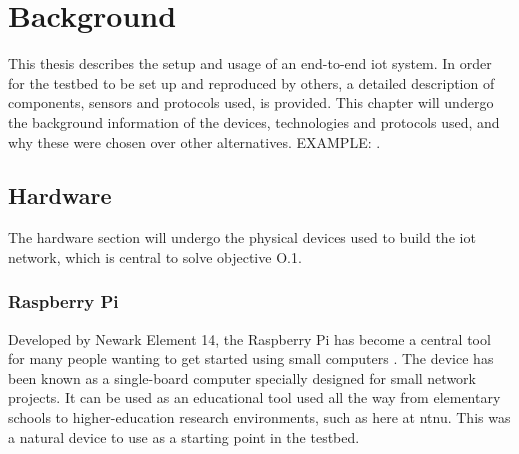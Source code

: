\chapter{Background}
\label{chp:background} 

\noindent This thesis describes the setup and usage of an end-to-end \gls{iot} system. In order for the testbed to be set up and reproduced by others, a detailed description of components, sensors and protocols used, is provided. This chapter will undergo the background information of the devices, technologies and protocols used, and why these were chosen over other alternatives. EXAMPLE: \cite{nord}. 






\section{Hardware}

\noindent The hardware section will undergo the physical devices used to build the \gls{iot} network, which is central to solve objective O.1. 

\subsection{Raspberry Pi}

\noindent Developed by Newark Element 14, the Raspberry Pi has become a central tool for many people wanting to get started using small computers \cite{newark}. The device has been known as a single-board computer specially designed for small network projects. It can be used as an educational tool used all the way from elementary schools to higher-education research environments, such as here at \gls{ntnu}. This was a natural device to use as a starting point in the testbed. 

